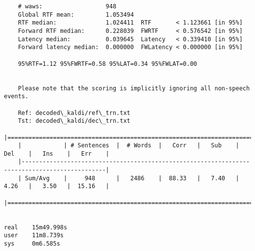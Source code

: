 


\begin{verbatim}
    # waws:                  948
    Global RTF mean:         1.053494
    RTF median:              1.024411  RTF       < 1.123661 [in 95%]
    Forward RTF median:      0.228039  FWRTF     < 0.576542 [in 95%]
    Latency median:          0.039645  Latency   < 0.339410 [in 95%]
    Forward latency median:  0.000000  FWLatency < 0.000000 [in 95%]
    
    95%RTF=1.12 95%FWRTF=0.58 95%LAT=0.34 95%FWLAT=0.00


    Please note that the scoring is implicitly ignoring all non-speech events.
    
    Ref: decoded\_kaldi/ref\_trn.txt
    Tst: decoded\_kaldi/dec\_trn.txt
    |==============================================================================================|
    |            | # Sentences  |  # Words  |   Corr   |   Sub    |   Del    |   Ins    |   Err    |
    |----------------------------------------------------------------------------------------------|
    | Sum/Avg    |     948      |   2486    |  88.33   |   7.40   |   4.26   |   3.50   |  15.16   |
    |==============================================================================================|
    

real    15m49.998s
user    11m8.739s
sys     0m6.585s
\end{verbatim}

